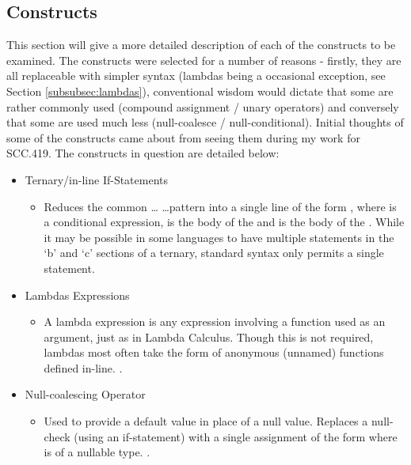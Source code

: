 \documentclass{article}
\begin{document}
    \subsection{Constructs}
        \label{subsec:constructs}
        This section will give a more detailed description of each of the constructs to be examined. The constructs were selected for a number of reasons - firstly, they are all replaceable with simpler syntax (lambdas being a occasional exception, see Section \ref{subsubsec:lambdas}), conventional wisdom would dictate that some are rather commonly used (compound assignment / unary operators) and conversely that some are used much less (null-coalesce / null-conditional). Initial thoughts of some of the constructs came about from seeing them during my work for SCC.419. The constructs in question are detailed below:
        \begin{itemize}
            \item Ternary/in-line If-Statements
                \begin{itemize}
                    \item Reduces the common  \dots {} \dots pattern into a single line of the form , where  is a conditional expression,  is the body of the  and  is the body of the . While it may be possible in some languages to have multiple statements in the `b' and `c' sections of a ternary, standard syntax only permits a single statement.
                \end{itemize}
            \item Lambdas Expressions
                \begin{itemize}
                    \item A lambda expression is any expression involving a function used as an argument, just as in Lambda Calculus. Though this is not required, lambdas most often take the form of anonymous (unnamed) functions defined in-line. \citep{javaLambdas}.
                \end{itemize}
            \item Null-coalescing Operator
                \begin{itemize}
                    \item Used to provide a default value in place of a null value. Replaces a null-check (using an if-statement) with a single assignment of the form \newline{} where  is of a nullable type. \citep{cs5Spec}.

\end{itemize}
\end{itemize}
\end{document}
